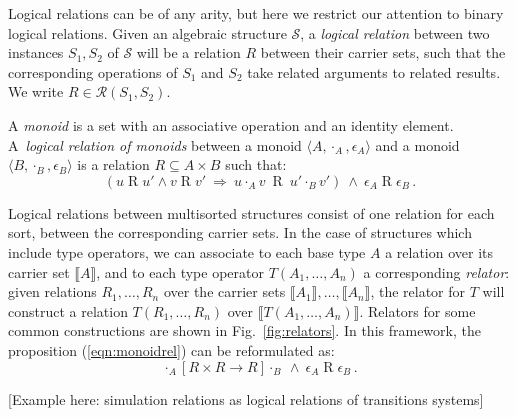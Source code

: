 \documentclass[acmsmall,authordraft]{acmart}
\newcommand{\ifr}[1]{\mathrel{[{#1}]}}
\begin{document}
Logical relations can be of any arity,
but here
we restrict our attention to
binary logical relations.
Given an algebraic structure $\mathcal{S}$,
a \emph{logical relation}
between two instances $S_1, S_2$ of $\mathcal{S}$
will be a relation $R$
between their carrier sets,
such that the corresponding operations of $S_1$ and $S_2$
take related arguments to related results.
We write $R \in \mathcal{R}(S_1, S_2)$.

\begin{example}
\label{ex:monoid}
A \emph{monoid} is a set with
an associative operation and
an identity element.
A~\emph{logical relation of monoids} between
a monoid $\langle A, \cdot_A, \epsilon_A \rangle$ and
a monoid $\langle B, \cdot_B, \epsilon_B \rangle$
is a relation $R \subseteq A \times B$
such that:
\begin{equation}
\label{eqn:monoidrel}
(u \mathrel{R} u' \wedge v \mathrel{R} v' \: \Rightarrow \:
 u \cdot_A v \: \mathrel{R} \: u' \cdot_B v')
\: \wedge \:
\epsilon_A \mathrel{R} \epsilon_B \,.
\end{equation}
\end{example}

Logical relations between multisorted structures
consist of one relation for each sort,
between the corresponding carrier sets.
In the case of structures which include type operators,
we can associate to each base type $A$
a relation over its carrier set $\llbracket A \rrbracket$,
and to each type operator $T(A_1, \ldots, A_n)$
a corresponding \emph{relator}:
given relations $R_1, \ldots, R_n$ over
the carrier sets $\llbracket A_1 \rrbracket, \ldots, \llbracket A_n \rrbracket$,
the relator for $T$
will construct a relation $T(R_1, \ldots, R_n)$
over $\llbracket T(A_1, \ldots, A_n) \rrbracket$.
Relators for some common constructions are shown in Fig.~\ref{fig:relators}.
In this framework, the proposition (\ref{eqn:monoidrel}) can be reformulated as:
\[
  \cdot_A \ifr{R \times R \rightarrow R} \cdot_B
  \: \wedge \:
  \epsilon_A \mathrel{R} \epsilon_B \,.
\]

[Example here: simulation relations as logical relations of transitions systems]
\end{document}
